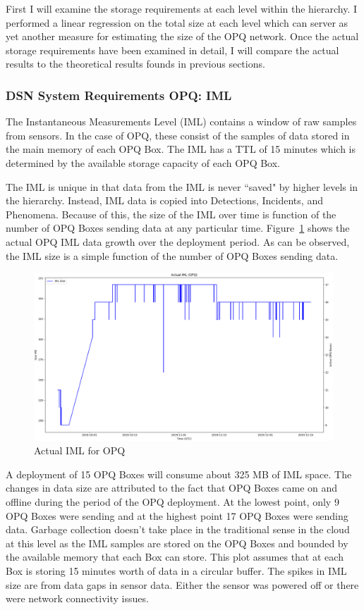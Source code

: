 First I will examine the storage requirements at each level within the hierarchy. I performed a linear regression on the total size at each level which can server as yet another measure for estimating the size of the OPQ network. Once the actual storage requirements have been examined in detail, I will compare the actual results to the theoretical results founds in previous sections.

\subsubsection{DSN System Requirements OPQ: IML}

The Instantaneous Measurements Level (IML) contains a window of raw samples from sensors. In the case of OPQ, these consist of the samples of data stored in the main memory of each OPQ Box. The IML has a TTL of 15 minutes which is determined by the available storage capacity of each OPQ Box.

The IML is unique in that data from the IML is never ``saved" by higher levels in the hierarchy. Instead, IML data is copied into Detections, Incidents, and Phenomena. Because of this, the size of the IML over time is function of the number of OPQ Boxes sending data at any particular time. Figure~\ref{fig:actual_iml_opq} shows the actual OPQ IML data growth over the deployment period. As can be observed, the IML size is a simple function of the number of OPQ Boxes sending data.

\begin{figure}[H]
    \centering
    \includegraphics[width=\linewidth]{figures/actual_iml_opq.png}
    \caption{Actual IML for OPQ}
    \label{fig:actual_iml_opq}
\end{figure}

A deployment of 15 OPQ Boxes will consume about 325 MB of IML space. The changes in data size are attributed to the fact that OPQ Boxes came on and offline during the period of the OPQ deployment. At the lowest point, only 9 OPQ Boxes were sending and at the highest point 17 OPQ Boxes were sending data. Garbage collection doesn't take place in the traditional sense in the cloud at this level as the IML samples are stored on the OPQ Boxes and bounded by the available memory that each Box can store. This plot assumes that at each Box is storing 15 minutes worth of data in a circular buffer. The spikes in IML size are from data gaps in sensor data. Either the sensor was powered off or there were network connectivity issues.

